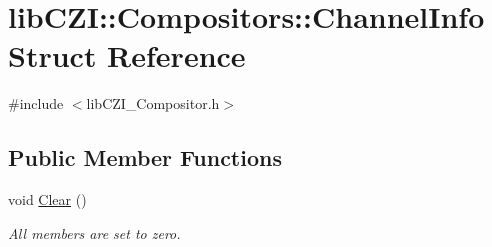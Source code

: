 \hypertarget{structlib_c_z_i_1_1_compositors_1_1_channel_info}{}\section{lib\+C\+ZI\+:\+:Compositors\+:\+:Channel\+Info Struct Reference}
\label{structlib_c_z_i_1_1_compositors_1_1_channel_info}


{\ttfamily \#include $<$lib\+C\+Z\+I\+\_\+\+Compositor.\+h$>$}

\subsection*{Public Member Functions}
\begin{DoxyCompactItemize}
\item 
\mbox{\label{structlib_c_z_i_1_1_compositors_1_1_channel_info_a6791d9d03a12930a8958e4e1938254ad}} 
void \hyperlink{structlib_c_z_i_1_1_compositors_1_1_channel_info_a6791d9d03a12930a8958e4e1938254ad}{Clear} ()
\begin{DoxyCompactList}\small\item\em All members are set to zero. \end{DoxyCompactList}\end{DoxyCompactItemize}
